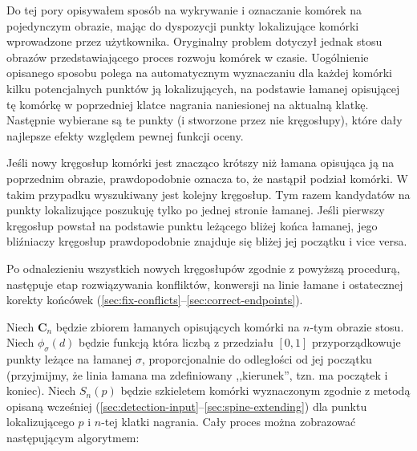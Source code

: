 \documentclass[declaration,shortabstract,mgr]{iithesis}
\begin{document}
Do tej pory opisywałem sposób na wykrywanie i oznaczanie komórek na pojedynczym obrazie, mając do dyspozycji punkty lokalizujące komórki wprowadzone przez użytkownika.
Oryginalny problem dotyczył jednak stosu obrazów przedstawiającego proces rozwoju komórek w czasie.
Uogólnienie opisanego sposobu polega na automatycznym wyznaczaniu dla każdej komórki kilku potencjalnych punktów ją lokalizujących, na podstawie łamanej opisującej tę komórkę w poprzedniej klatce nagrania naniesionej na aktualną klatkę.
Następnie wybierane są te punkty (i stworzone przez nie kręgosłupy), które dały najlepsze efekty względem pewnej funkcji oceny.

Jeśli nowy kręgosłup komórki jest znacząco krótszy niż łamana opisująca ją na poprzednim obrazie, prawdopodobnie oznacza to, że nastąpił podział komórki. W takim przypadku wyszukiwany jest kolejny kręgosłup. Tym razem kandydatów na punkty lokalizujące poszukuję tylko po jednej stronie łamanej. Jeśli pierwszy kręgosłup powstał na podstawie punktu leżącego bliżej końca łamanej, jego bliźniaczy kręgosłup prawdopodobnie znajduje się bliżej jej początku i vice versa.

Po odnalezieniu wszystkich nowych kręgosłupów zgodnie z powyższą procedurą, następuje etap rozwiązywania konfliktów, konwersji na linie łamane i ostatecznej korekty końcówek (\ref{sec:fix-conflicts}--\ref{sec:correct-endpoints}).



Niech $\mathbf{C}_n$ będzie zbiorem łamanych opisujących komórki na $n$-tym obrazie stosu.
Niech $\phi_\sigma(d)$ będzie funkcją która liczbą z przedziału $[0, 1]$ przyporządkowuje punkty leżące na łamanej $\sigma$, proporcjonalnie do odległości od jej początku (przyjmijmy, że linia łamana ma zdefiniowany ,,kierunek'', tzn. ma początek i koniec). Niech $S_n(p)$ będzie szkieletem komórki wyznaczonym zgodnie z metodą opisaną wcześniej (\ref{sec:detection-input}--\ref{sec:spine-extending}) dla punktu lokalizującego $p$ i $n$-tej klatki nagrania.
Cały proces można zobrazować następującym algorytmem:
\end{document}
